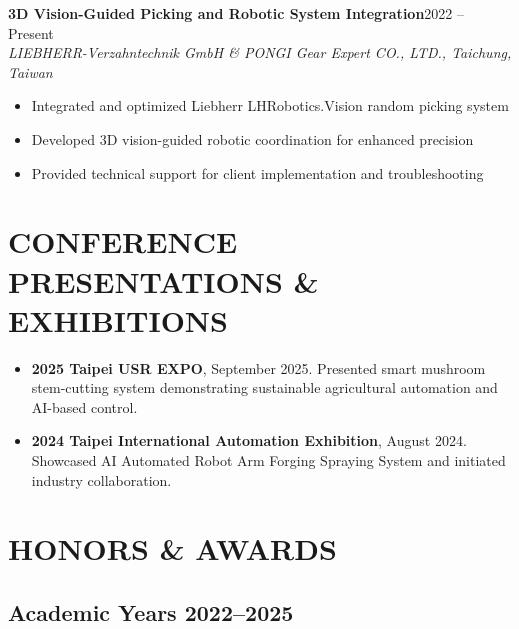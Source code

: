 \documentclass[11pt,a4paper]{article}
\newcommand{\cventry}[4]{
    \noindent\textbf{#1}\hfill#2\\
    \textit{#3}\\
    #4
    \vspace{0.3cm}
}
\begin{document}
\cventry{3D Vision-Guided Picking and Robotic System Integration}{2022 -- Present}
{LIEBHERR-Verzahntechnik GmbH \& PONGI Gear Expert CO., LTD., Taichung, Taiwan}
{
    \begin{itemize}[leftmargin=*, itemsep=0pt]
        \item Integrated and optimized Liebherr LHRobotics.Vision random picking system
        \item Developed 3D vision-guided robotic coordination for enhanced precision
        \item Provided technical support for client implementation and troubleshooting
    \end{itemize}
}

\section*{CONFERENCE PRESENTATIONS \& EXHIBITIONS}

\begin{itemize}[leftmargin=*, itemsep=4pt]
    \item \textbf{2025 Taipei USR EXPO}, September 2025. Presented smart mushroom stem-cutting system demonstrating sustainable agricultural automation and AI-based control.

    \item \textbf{2024 Taipei International Automation Exhibition}, August 2024. Showcased AI Automated Robot Arm Forging Spraying System and initiated industry collaboration.
\end{itemize}

\section*{HONORS \& AWARDS}

\subsection*{Academic Years 2022--2025}
\end{document}
